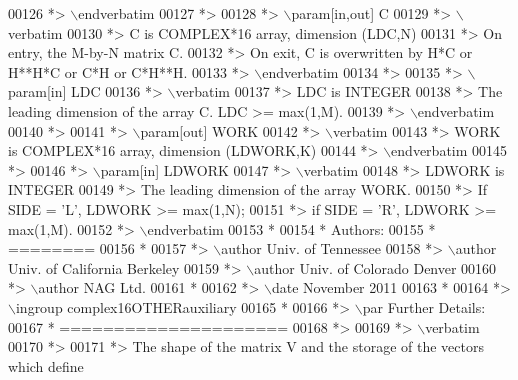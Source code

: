 \begin{DoxyCode}
00126 \textcolor{comment}{*> \(\backslash\)endverbatim}
00127 \textcolor{comment}{*>}
00128 \textcolor{comment}{*> \(\backslash\)param[in,out] C}
00129 \textcolor{comment}{*> \(\backslash\)verbatim}
00130 \textcolor{comment}{*>          C is COMPLEX*16 array, dimension (LDC,N)}
00131 \textcolor{comment}{*>          On entry, the M-by-N matrix C.}
00132 \textcolor{comment}{*>          On exit, C is overwritten by H*C or H**H*C or C*H or C*H**H.}
00133 \textcolor{comment}{*> \(\backslash\)endverbatim}
00134 \textcolor{comment}{*>}
00135 \textcolor{comment}{*> \(\backslash\)param[in] LDC}
00136 \textcolor{comment}{*> \(\backslash\)verbatim}
00137 \textcolor{comment}{*>          LDC is INTEGER}
00138 \textcolor{comment}{*>          The leading dimension of the array C. LDC >= max(1,M).}
00139 \textcolor{comment}{*> \(\backslash\)endverbatim}
00140 \textcolor{comment}{*>}
00141 \textcolor{comment}{*> \(\backslash\)param[out] WORK}
00142 \textcolor{comment}{*> \(\backslash\)verbatim}
00143 \textcolor{comment}{*>          WORK is COMPLEX*16 array, dimension (LDWORK,K)}
00144 \textcolor{comment}{*> \(\backslash\)endverbatim}
00145 \textcolor{comment}{*>}
00146 \textcolor{comment}{*> \(\backslash\)param[in] LDWORK}
00147 \textcolor{comment}{*> \(\backslash\)verbatim}
00148 \textcolor{comment}{*>          LDWORK is INTEGER}
00149 \textcolor{comment}{*>          The leading dimension of the array WORK.}
00150 \textcolor{comment}{*>          If SIDE = 'L', LDWORK >= max(1,N);}
00151 \textcolor{comment}{*>          if SIDE = 'R', LDWORK >= max(1,M).}
00152 \textcolor{comment}{*> \(\backslash\)endverbatim}
00153 \textcolor{comment}{*}
00154 \textcolor{comment}{*  Authors:}
00155 \textcolor{comment}{*  ========}
00156 \textcolor{comment}{*}
00157 \textcolor{comment}{*> \(\backslash\)author Univ. of Tennessee }
00158 \textcolor{comment}{*> \(\backslash\)author Univ. of California Berkeley }
00159 \textcolor{comment}{*> \(\backslash\)author Univ. of Colorado Denver }
00160 \textcolor{comment}{*> \(\backslash\)author NAG Ltd. }
00161 \textcolor{comment}{*}
00162 \textcolor{comment}{*> \(\backslash\)date November 2011}
00163 \textcolor{comment}{*}
00164 \textcolor{comment}{*> \(\backslash\)ingroup complex16OTHERauxiliary}
00165 \textcolor{comment}{*}
00166 \textcolor{comment}{*> \(\backslash\)par Further Details:}
00167 \textcolor{comment}{*  =====================}
00168 \textcolor{comment}{*>}
00169 \textcolor{comment}{*> \(\backslash\)verbatim}
00170 \textcolor{comment}{*>}
00171 \textcolor{comment}{*>  The shape of the matrix V and the storage of the vectors which define}

\end{DoxyCode}
